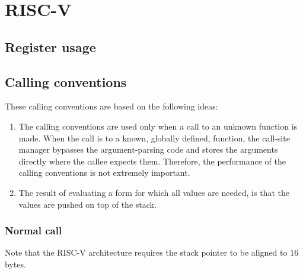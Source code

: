 \chapter{RISC-V}
\label{chapter-backend-risc-v}

\section{Register usage}
\label{sec-backend-risc-v-register-usage}

\section{Calling conventions}
\label{sec-backend-risc-v-calling-conventions}

These calling conventions are based on the following ideas:

\begin{enumerate}
\item The calling conventions are used only when a call to an unknown
  function is made.  When the call is to a known, globally defined,
  function, the call-site manager bypasses the argument-parsing code
  and stores the arguments directly where the callee expects them.
  Therefore, the performance of the calling conventions is not
  extremely important.
\item The result of evaluating a form for which all values are needed,
  is that the values are pushed on top of the stack.
\end{enumerate}

\subsection{Normal call}

Note that the RISC-V architecture requires the stack pointer to be
aligned to $16$ bytes.

